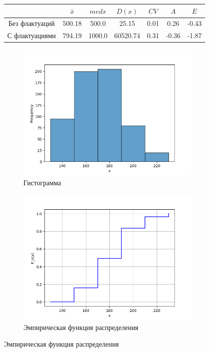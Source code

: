 \documentclass[12pt,a4paper]{article}
\begin{document}
\begin{figure}
		\begin{subtable}[htbp!]{0.8\textwidth}
			\centering
			\begin{tabular}{ |c|c|c|c|c|c|c| }
				\hline
				& \( \bar x \) & \( med x \) & \( D(x) \) & \( CV \) & \( A \) & \( E \) \\
				\hline
				Без флактуаций & 500.18 & 500.0 & 25.15 & 0.01 & 0.26 & -0.43 \\
				\hline
				С флактуациями & 794.19 & 1000.0 & 60520.74 & 0.31 & -0.36 & -1.87 \\
				\hline
			\end{tabular}
		\end{subtable}
	\end{figure}

	\begin{figure}
		\begin{subfigure}[htbp!]{0.8\textwidth}
			\begin{center}
				\includegraphics[width = 0.8\linewidth]{../graphics/9_hist.png}
				\caption{Гистограмма}
			\end{center}
		\end{subfigure}

		\begin{subfigure}[htbp!]{0.8\textwidth}
			\begin{center}
				\includegraphics[width = 0.8\linewidth]{../graphics/9_cdf.png}
				\caption{Эмпирическая функция распределения}
			\end{center}
		\end{subfigure}


\end{figure}
\end{document}
